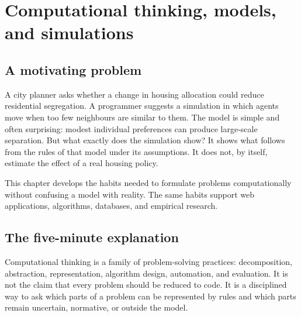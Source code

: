 \chapter{Computational thinking, models, and simulations}
\label{ch:computational-thinking}

\section{A motivating problem}
A city planner asks whether a change in housing allocation could reduce residential segregation. A programmer suggests a simulation in which agents move when too few neighbours are similar to them. The model is simple and often surprising: modest individual preferences can produce large-scale separation. But what exactly does the simulation show? It shows what follows from the rules of that model under its assumptions. It does not, by itself, estimate the effect of a real housing policy.

This chapter develops the habits needed to formulate problems computationally without confusing a model with reality. The same habits support web applications, algorithms, databases, and empirical research.


\section{The five-minute explanation}
Computational thinking is a family of problem-solving practices: decomposition, abstraction, representation, algorithm design, automation, and evaluation. It is not the claim that every problem should be reduced to code. It is a disciplined way to ask which parts of a problem can be represented by rules and which parts remain uncertain, normative, or outside the model.


